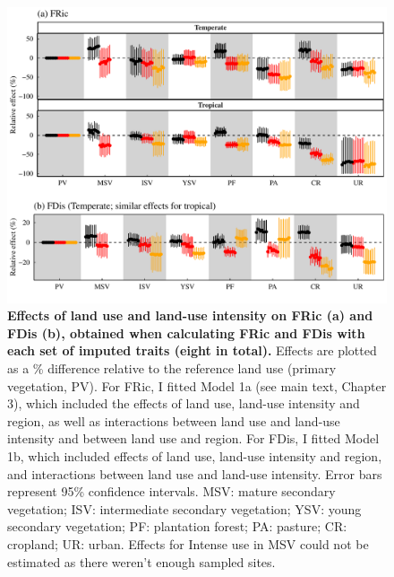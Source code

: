 \begin{figure}[h!]
\centering
\includegraphics[scale=0.7]{Supporting/Chapter3/Figures/Figure_SI_20}
\caption[Effects of land use and land-use intensity on FRic (a) and FDis (b), obtained when calculating FRic and FDis with each set of imputed traits]{\textbf{Effects of land use and land-use intensity on FRic (a) and FDis (b), obtained when calculating FRic and FDis with each set of imputed traits (eight in total).} Effects are plotted as a \% difference relative to the reference land use (primary vegetation, PV). For FRic, I fitted Model 1a (see main text, Chapter 3), which included the effects of land use, land-use intensity and region, as well as interactions between land use and land-use intensity and between land use and region. For FDis, I fitted Model 1b, which included effects of land use, land-use intensity and region, and interactions between land use and land-use intensity. Error bars represent 95\% confidence intervals. MSV: mature secondary vegetation; ISV: intermediate secondary vegetation; YSV: young secondary vegetation; PF: plantation forest; PA: pasture; CR: cropland; UR: urban. Effects for Intense use in MSV could not be estimated as there weren’t enough sampled sites.}
\label{SI3_F20}
\end{figure}

